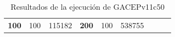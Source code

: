 \begin{table}[H]
\begin{tabular}{|ccrccrccc}
\multicolumn{1}{|c|}{\multirow{-39}{*}{\cellcolor[HTML]{FFFFC7}\textbf{100}}} & \multicolumn{1}{c|}{\multirow{-9}{*}{\cellcolor[HTML]{DDFDFF}100}} & \multicolumn{1}{r|}{\cellcolor[HTML]{DAE8FC}115182}    & \multicolumn{1}{c|}{\multirow{-39}{*}{\cellcolor[HTML]{FFFFC7}\textbf{200}}} & \multicolumn{1}{c|}{\multirow{-10}{*}{\cellcolor[HTML]{DDFDFF}100}} & \multicolumn{1}{r|}{\cellcolor[HTML]{DDFDFF}538755}    &                                                                              &                                                                    &                                                        \\ \cline{1-6}
\end{tabular}
\caption{\label{res:GACEPv11c50}Resultados de la ejecución de GACEPv11c50}
\end{table}


